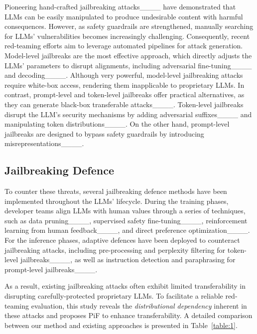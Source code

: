 Pioneering hand-crafted jailbreaking attacks____ have demonstrated that LLMs can be easily manipulated to produce undesirable content with harmful consequences. 
However, as safety guardrails are strengthened, manually searching for LLMs' vulnerabilities becomes increasingly challenging.
Consequently, recent red-teaming efforts aim to leverage automated pipelines for attack generation.
Model-level jailbreaks are the most effective approach, which directly adjusts the LLMs' parameters to disrupt alignments, including adversarial fine-tuning____ and decoding____.
Although very powerful, model-level jailbreaking attacks require white-box access, rendering them inapplicable to proprietary LLMs.
In contrast, prompt-level and token-level jailbreaks offer practical alternatives, as they can generate black-box transferable attacks____.
Token-level jailbreaks disrupt the LLM's security mechanisms by adding adversarial suffixes____ and manipulating token distributions____.
On the other hand, prompt-level jailbreaks are designed to bypass safety guardrails by introducing misrepresentations____.

\subsection{Jailbreaking Defence}
\label{section:2_3}

To counter these threats, several jailbreaking defence methods have been implemented throughout the LLMs' lifecycle.
During the training phases, developer teams align LLMs with human values through a series of techniques, such as data pruning____, supervised safety fine-tuning____, reinforcement learning from human feedback____, and direct preference optimization____.
For the inference phases, adaptive defences have been deployed to counteract jailbreaking attacks, including pre-processing and perplexity filtering for token-level jailbreaks____, as well as instruction detection and paraphrasing for prompt-level jailbreaks____.

As a result, existing jailbreaking attacks often exhibit limited transferability in disrupting carefully-protected proprietary LLMs.
To facilitate a reliable red-teaming evaluation, this study reveals the \emph{distributional dependency} inherent in these attacks and proposes PiF to enhance transferability.
A detailed comparison between our method and existing approaches is presented in Table~\ref{table:1}.